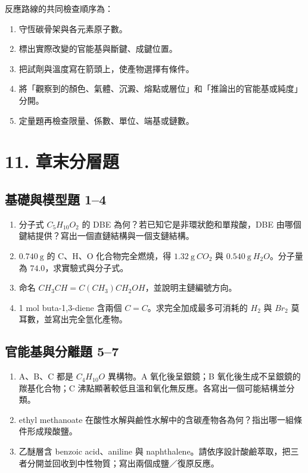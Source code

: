 \documentclass[11pt,a4paper]{article}
\providecommand{\tightlist}{%
  \setlength{\itemsep}{0pt}\setlength{\parskip}{0pt}}
\begin{document}
反應路線的共同檢查順序為：

\begin{enumerate}
\def\labelenumi{\arabic{enumi}.}
\tightlist
\item
  守恆碳骨架與各元素原子數。
\item
  標出實際改變的官能基與斷鍵、成鍵位置。
\item
  把試劑與溫度寫在箭頭上，使產物選擇有條件。
\item
  將「觀察到的顏色、氣體、沉澱、熔點或層位」和「推論出的官能基或純度」分開。
\item
  定量題再檢查限量、係數、單位、端基或鏈數。
\end{enumerate}

\section{11. 章末分層題}\label{ux7ae0ux672bux5206ux5c64ux984c}

\subsection{基礎與模型題 1--4}\label{ux57faux790eux8207ux6a21ux578bux984c-14}

\begin{enumerate}
\def\labelenumi{\arabic{enumi}.}
\tightlist
\item
  分子式 \(C_5H_{10}O_2\) 的 DBE 為何？若已知它是非環狀飽和單羧酸，DBE 由哪個鍵結提供？寫出一個直鏈結構與一個支鏈結構。
\item
  \(0.740\ \mathrm g\) 的 C、H、O 化合物完全燃燒，得 \(1.32\ \mathrm g\ CO_2\) 與 \(0.540\ \mathrm g\ H_2O\)。分子量為 \(74.0\)，求實驗式與分子式。
\item
  命名 \(CH_3CH=C(CH_3)CH_2OH\)，並說明主鏈編號方向。
\item
  1 mol buta-1,3-diene 含兩個 \(C=C\)。求完全加成最多可消耗的 \(H_2\) 與 \(Br_2\) 莫耳數，並寫出完全氫化產物。
\end{enumerate}

\subsection{官能基與分離題 5--7}\label{ux5b98ux80fdux57faux8207ux5206ux96e2ux984c-57}

\begin{enumerate}
\def\labelenumi{\arabic{enumi}.}
\setcounter{enumi}{4}
\tightlist
\item
  A、B、C 都是 \(C_4H_{10}O\) 異構物。A 氧化後呈銀鏡；B 氧化後生成不呈銀鏡的羰基化合物；C 沸點顯著較低且溫和氧化無反應。各寫出一個可能結構並分類。
\item
  ethyl methanoate 在酸性水解與鹼性水解中的含碳產物各為何？指出哪一組條件形成羧酸鹽。
\item
  乙醚層含 benzoic acid、aniline 與 naphthalene。請依序設計酸鹼萃取，把三者分開並回收到中性物質；寫出兩個成鹽／復原反應。
\end{enumerate}
\end{document}
